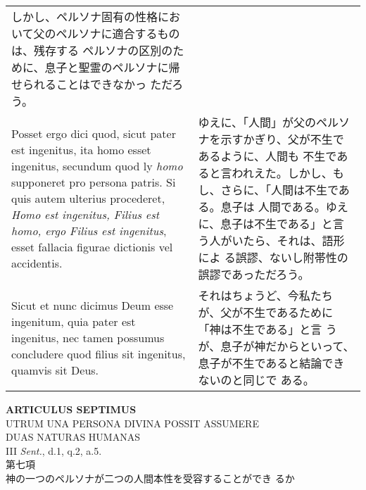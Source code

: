 \documentclass[10pt]{jsarticle} %
\begin{document}
\begin{longtable}{p{21em}p{21em}}
しかし、ペルソナ固有の性格において父のペルソナに適合するものは、残存する
 ペルソナの区別のために、息子と聖霊のペルソナに帰せられることはできなかっ
 ただろう。

\\


Posset ergo dici quod, sicut
pater est ingenitus, ita homo esset ingenitus, secundum quod ly {\itshape homo}
supponeret pro persona patris. Si quis autem ulterius procederet, {\itshape Homo
est ingenitus, Filius est homo, ergo Filius est ingenitus}, esset
fallacia figurae dictionis vel accidentis. 


&

ゆえに、「人間」が父のペルソナを示すかぎり、父が不生であるように、人間も
 不生であると言われえた。しかし、もし、さらに、「人間は不生である。息子は
 人間である。ゆえに、息子は不生である」と言う人がいたら、それは、語形によ
 る誤謬、ないし附帯性の誤謬であっただろう。

\\


Sicut et nunc dicimus Deum
esse ingenitum, quia pater est ingenitus, nec tamen possumus concludere
quod filius sit ingenitus, quamvis sit Deus.


&


それはちょうど、今私たちが、父が不生であるために「神は不生である」と言
 うが、息子が神だからといって、息子が不生であると結論できないのと同じで
 ある。


\end{longtable}
\newpage


\begin{center}
 {\Large {\bf ARTICULUS SEPTIMUS}}\\
 {\large UTRUM UNA PERSONA DIVINA POSSIT ASSUMERE\\ DUAS NATURAS HUMANAS}\\
 {\footnotesize III {\itshape Sent.}, d.1, q.2, a.5.}\\
 {\Large 第七項\\神の一つのペルソナが二つの人間本性を受容することができ
 るか}
\end{center}
\end{document}
